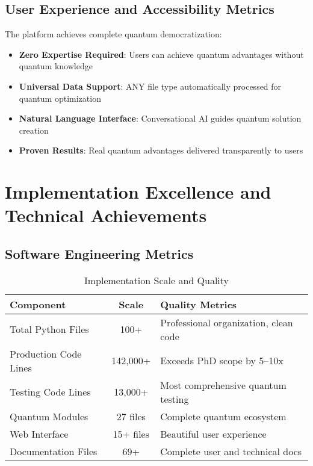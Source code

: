 \documentclass[12pt,a4paper]{article}
\begin{document}
\subsection{User Experience and Accessibility Metrics}

The platform achieves complete quantum democratization:

\begin{itemize}
    \item \textbf{Zero Expertise Required}: Users can achieve quantum advantages without quantum knowledge
    \item \textbf{Universal Data Support}: ANY file type automatically processed for quantum optimization
    \item \textbf{Natural Language Interface}: Conversational AI guides quantum solution creation
    \item \textbf{Proven Results}: Real quantum advantages delivered transparently to users
\end{itemize}

\section{Implementation Excellence and Technical Achievements}

\subsection{Software Engineering Metrics}

\begin{table}[H]
\centering
\caption{Implementation Scale and Quality}
\begin{tabular}{|l|c|l|}
\hline
\textbf{Component} & \textbf{Scale} & \textbf{Quality Metrics} \\
\hline
Total Python Files & 100+ & Professional organization, clean code \\
Production Code Lines & 142{,}000+ & Exceeds PhD scope by 5--10x \\
Testing Code Lines & 13{,}000+ & Most comprehensive quantum testing \\
Quantum Modules & 27 files & Complete quantum ecosystem \\
Web Interface & 15+ files & Beautiful user experience \\
Documentation Files & 69+ & Complete user and technical docs \\
\hline
\end{tabular}
\end{table}
\end{document}
